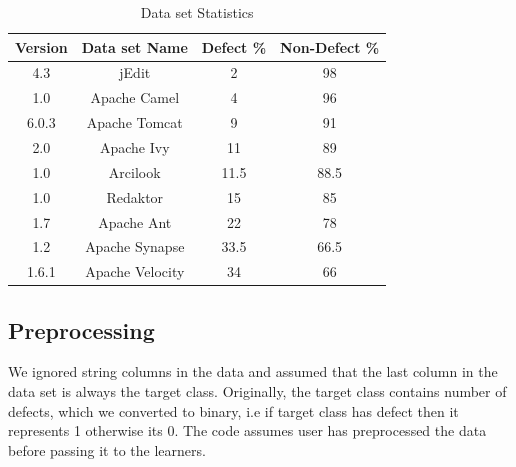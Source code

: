 \documentclass[sigconf,review, anonymous]{acmart}
\theoremstyle{break}
\theoremstyle{break}
\begin{document}
 \begin{table}[!htbp]
\begin{center}
\begin{tabular}{|c|c|c|c|}
\hline 
\textbf{Version} & \textbf{Data set Name} &  \textbf{Defect \%} & \textbf{Non-Defect \%}\\[0.5ex]
\hline
4.3 & jEdit & 2 & 98 \\
\hline
1.0 & Apache Camel & 4 & 96 \\ 
\hline
6.0.3 & Apache Tomcat & 9 & 91 \\
\hline
2.0 & Apache Ivy & 11 & 89 \\ 
\hline
1.0 & Arcilook & 11.5 & 88.5\\
\hline
1.0 & Redaktor & 15 & 85 \\
\hline
1.7 & Apache Ant & 22 & 78 \\ 
\hline
1.2 & Apache Synapse & 33.5 & 66.5 \\
\hline
1.6.1 & Apache Velocity & 34 & 66 \\
\hline
\end{tabular}
\end{center}
\caption{Data set Statistics}
\label{tb:dataset}
\end{table}

\subsection{\textbf{Preprocessing}}
 We ignored  string columns in the data and assumed that the last column in the data set is always the target class. Originally, the target class contains number of defects, which we converted to binary, i.e if target class has defect then it represents 1 otherwise its 0. The code assumes user has preprocessed the data before passing it to the learners. 
\end{document}
